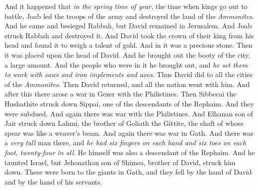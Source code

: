 \begin{biblechapter} %
 And it happened that \textit{in the spring time of year}, the time when kings go out to battle, Joab led the troops of the army and destroyed the land of the \textit{Ammonites}. And he came and besieged Rabbah, but David remained in Jerusalem. And Joab struck Rabbah and destroyed it.
\verse And David took the crown of their king from his head and found it to weigh a talent of gold. And in it was a precious stone. Then it was placed upon the head of David. And he brought out the booty of the city, a large amount.
\verse And the people who were in it he brought out, and \textit{he set them to work with saws and iron implements and axes}. Thus David did to all the cities of the \textit{Ammonites}. Then David returned, and all the nation went with him.
 And after this there arose a war in Gezer with the Philistines. Then Sibbecai the Hushathite struck down Sippai, one of the descendants of the Rephaim. And they were subdued.
\verse And again there was war with the Philistines. And Elhanan son of Jair struck down Lahmi, the brother of Goliath the Gittite, the shaft of whose spear was like a weaver’s beam.
\verse And again there was war in Gath. And there was a \textit{very tall} man there, and \textit{he had six fingers on each hand and six toes on each foot, twenty-four in all}. He himself was also a descendant of the Rephaim.
\verse And he taunted Israel, but Jehonathan son of Shimea, brother of David, struck him down.
\verse These were born to the giants in Gath, and they fell by the hand of David and by the hand of his servants.
\end{biblechapter}

